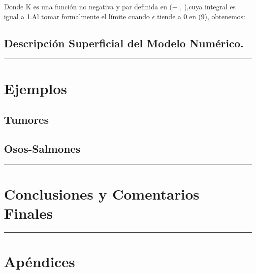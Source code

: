 \documentclass[letterpaper]{article}
\begin{document}
{\begin{equation}
        \end{equation}

        \normalsize{Donde K es una función no negativa y par definida en (− \infty, \infty),cuya integral es igual a 1.Al tomar formalmente el límite cuando $\epsilon$ tiende a 0 en (9), obtenemos:}\\


        
        \subsection{Descripción Superficial del Modelo Numérico.}
          


    }

    \vspace{0.2cm}
        \rule{150mm}{0.5mm} %
    \vspace{0.2cm}

    \section{Ejemplos}{

        \subsection{Tumores}

        \subsection{Osos-Salmones}
    
    }

    \vspace{0.2cm}
        \rule{150mm}{0.5mm} %
    \vspace{0.2cm}

    \section{Conclusiones y Comentarios Finales}

    \vspace{0.2cm}
        \rule{150mm}{0.5mm} %
    \vspace{0.2cm}

    \section{Apéndices}
\end{document}
